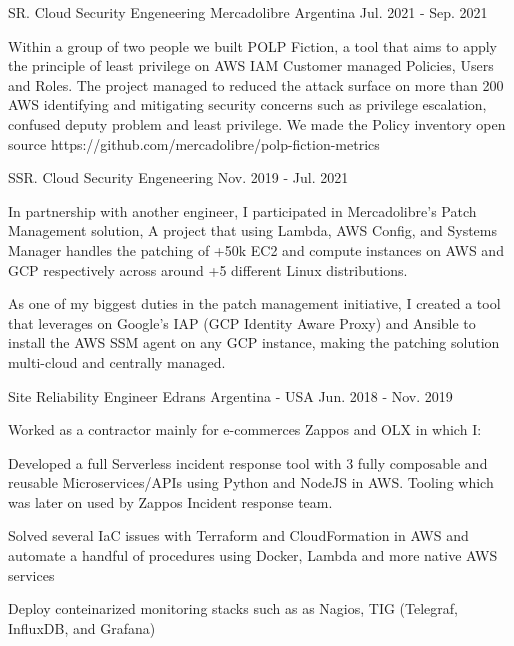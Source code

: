 \begin{cventries}
\cventry
{SR. Cloud Security Engeneering} %
{Mercadolibre} %
{Argentina} %
{Jul. 2021 - Sep. 2021} %
{
\begin{cvitems} %
\item {Within a group of two people we built POLP Fiction, a tool that aims to apply the principle of least privilege on AWS IAM Customer managed Policies, Users and Roles. The project managed to reduced the attack surface on more than 200 AWS identifying and mitigating security concerns such as privilege escalation, confused deputy problem and least privilege. We made the Policy inventory open source https://github.com/mercadolibre/polp-fiction-metrics}
\end{cvitems} 
}
\cventry
{SSR. Cloud Security Engeneering} %
{} %
{} %
{Nov. 2019 - Jul. 2021} %
{
\begin{cvitems} %
\item {In partnership with another engineer, I participated in Mercadolibre's Patch Management solution, A project that using Lambda, AWS Config, and Systems Manager handles the patching of +50k EC2 and compute instances on AWS and GCP respectively across around +5 different Linux distributions.}
\item {As one of my biggest duties in the patch management initiative, I created a tool that leverages on Google's IAP (GCP Identity Aware Proxy) and Ansible to install the AWS SSM agent on any GCP instance, making the patching solution multi-cloud and centrally managed.}
\end{cvitems} 
}

\cventry
{Site Reliability Engineer} %
{Edrans} %
{Argentina - USA} %
{Jun. 2018 - Nov. 2019} %
{
{Worked as a contractor mainly for e-commerces Zappos and OLX in which I:}
\linebreak
\begin{cvitems} %
\item {Developed a full Serverless incident response tool with 3 fully composable and reusable Microservices/APIs using Python and NodeJS in AWS. Tooling which was later on used by Zappos Incident response team.}
\item {Solved several IaC issues with Terraform and CloudFormation in AWS and automate a handful of procedures using Docker, Lambda and more native AWS services}
\item {Deploy conteinarized monitoring stacks such as as Nagios, TIG (Telegraf, InfluxDB, and Grafana)}
\end{cvitems}
}


\end{cventries}

